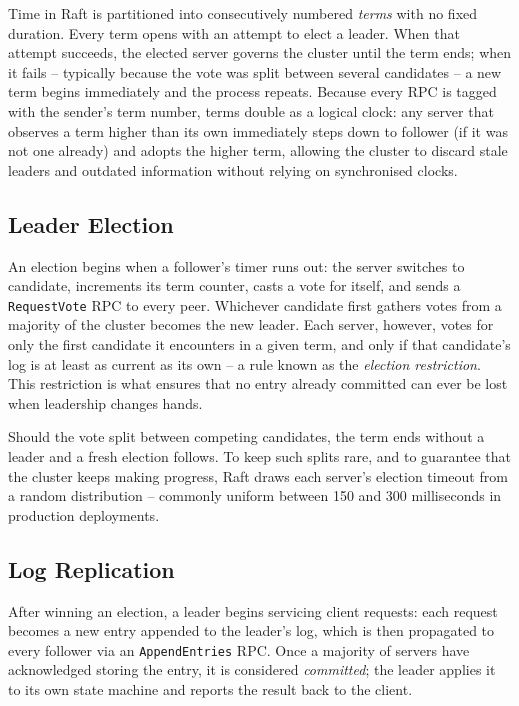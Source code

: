 Time in Raft is partitioned into consecutively numbered \emph{terms} with no fixed duration. Every term opens with an attempt to elect a leader. When that attempt succeeds, the elected server governs the cluster until the term ends; when it fails -- typically because the vote was split between several candidates -- a new term begins immediately and the process repeats. Because every RPC is tagged with the sender's term number, terms double as a logical clock: any server that observes a term higher than its own immediately steps down to follower (if it was not one already) and adopts the higher term, allowing the cluster to discard stale leaders and outdated information without relying on synchronised clocks.

\subsection{Leader Election}

An election begins when a follower's timer runs out: the server switches to candidate, increments its term counter, casts a vote for itself, and sends a \texttt{RequestVote} RPC to every peer. Whichever candidate first gathers votes from a majority of the cluster becomes the new leader. Each server, however, votes for only the first candidate it encounters in a given term, and only if that candidate's log is at least as current as its own -- a rule known as the \emph{election restriction}. This restriction is what ensures that no entry already committed can ever be lost when leadership changes hands.

Should the vote split between competing candidates, the term ends without a leader and a fresh election follows. To keep such splits rare, and to guarantee that the cluster keeps making progress, Raft draws each server's election timeout from a random distribution -- commonly uniform between 150 and 300 milliseconds in production deployments.

\subsection{Log Replication}

After winning an election, a leader begins servicing client requests: each request becomes a new entry appended to the leader's log, which is then propagated to every follower via an \texttt{AppendEntries} RPC. Once a majority of servers have acknowledged storing the entry, it is considered \emph{committed}; the leader applies it to its own state machine and reports the result back to the client.

